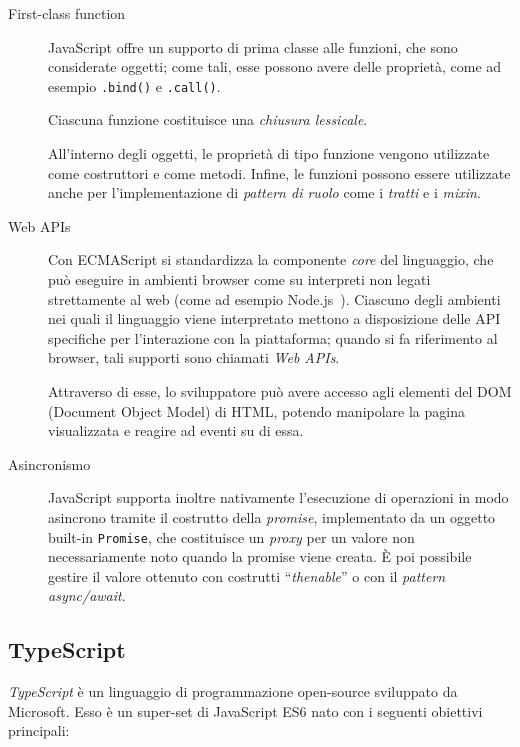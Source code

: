 \begin{description}
        \item[First-class function]
          JavaScript offre un supporto di prima classe alle funzioni, che sono considerate oggetti;
          come tali, esse possono avere delle proprietà, come ad esempio \texttt{.bind()} e \texttt{.call()}. %

          Ciascuna funzione costituisce una \emph{chiusura lessicale}.

          All'interno degli oggetti, le proprietà di tipo funzione vengono utilizzate come costruttori e come metodi.
          Infine, le funzioni possono essere utilizzate anche per l'implementazione di \emph{pattern di ruolo} come i \emph{tratti} e i \emph{mixin}.

        \item[Web APIs]
          Con ECMAScript si standardizza la componente \emph{core} del linguaggio, che può eseguire in ambienti browser come su interpreti non legati strettamente al web (come ad esempio Node.js~\cite{5617064}).
          Ciascuno degli ambienti nei quali il linguaggio viene interpretato mettono a disposizione delle API specifiche per l'interazione con la piattaforma;
          quando si fa riferimento al browser, tali supporti sono chiamati \emph{Web APIs}.

          Attraverso di esse, lo sviluppatore può avere accesso agli elementi del DOM (Document Object Model) di HTML, potendo manipolare la pagina visualizzata e reagire ad eventi su di essa.

        \item[Asincronismo]
          JavaScript supporta inoltre nativamente l'esecuzione di operazioni in modo asincrono tramite il costrutto della \emph{promise}, implementato da un oggetto built-in \texttt{Promise},
          che costituisce un \emph{proxy} per un valore non necessariamente noto quando la promise viene creata.
          È poi possibile gestire il valore ottenuto con costrutti ``\emph{thenable}'' o con il \emph{pattern async/await}.
      \end{description}

    \subsection{TypeScript}\label{subsec:ts}
      \emph{TypeScript} è un linguaggio di programmazione open-source sviluppato da Microsoft.
      Esso è un super-set di JavaScript ES6 nato con i seguenti obiettivi principali:

